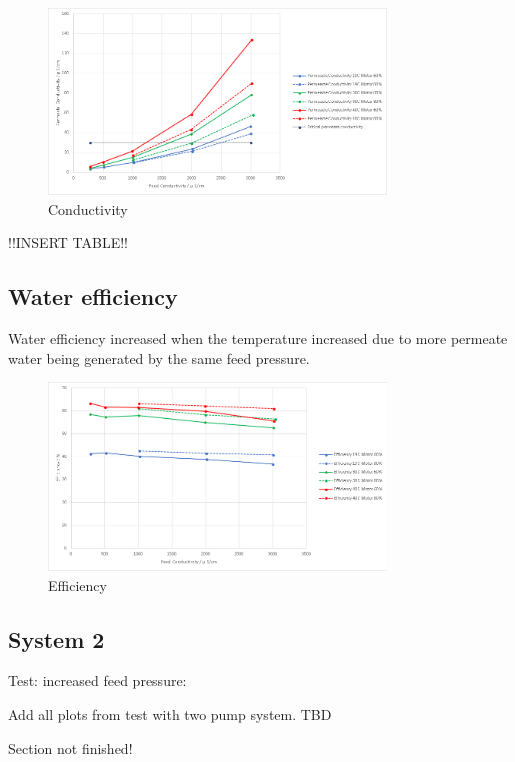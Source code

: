 \begin{figure}[H]
    \centering
    \includegraphics[width=0.8\textwidth]{PermCond}
    \caption{Conductivity}
    \label{fig:PressConn}
\end{figure}

!!INSERT TABLE!!

\subsection{Water efficiency}

Water efficiency increased when the temperature increased due to more permeate water being generated by the same feed pressure.

\begin{figure}[H]
    \centering
    \includegraphics[width=0.8\textwidth]{Efficiency}
    \caption{Efficiency}
    \label{fig:PressConn}
\end{figure}

\subsection{System 2}

Test: increased feed pressure:

Add all plots from test with two pump system. TBD 

Section not finished! 



